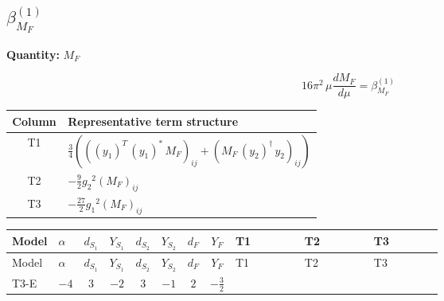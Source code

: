 \documentclass[8pt]{article}
\begin{document}
\begin{landscape}
\section*{$\beta_{M_F}^{(1)}$}
\noindent\textbf{Quantity: }$M_F$\par\smallskip
\[16\pi^2\,\mu\frac{d M_F}{d\mu}=\beta_{M_F}^{(1)}\]
\begin{center}
\begin{tabular}{@{}c >{\raggedright\arraybackslash}p{0.82\linewidth}@{}}
\toprule
Column & Representative term structure \\
\midrule
T1 & \(\displaystyle \frac{3}{4} (\left(\left({y_1}\right)^{T}\,\left({y_1}\right)^{*}\,{M_F}\right)_{ij}+\left({M_F}\,\left({y_2}\right)^{\dagger}\,{y_2}\right)_{ij})\) \\
\midrule
T2 & \(\displaystyle -\frac{9}{2} {g_2}^2 \left({M_F}\right)_{ij}\) \\
\midrule
T3 & \(\displaystyle -\frac{27}{2} {g_1}^2 \left({M_F}\right)_{ij}\) \\
\midrule
\bottomrule
\end{tabular}
\end{center}
\smallskip
\tiny
\begin{longtable}{@{}llcccccc >{\raggedright\arraybackslash}p{0.21\linewidth} >{\raggedright\arraybackslash}p{0.21\linewidth} >{\raggedright\arraybackslash}p{0.21\linewidth}@{}}
\toprule
Model & $\alpha$ & $d_{S_1}$ & $Y_{S_1}$ & $d_{S_2}$ & $Y_{S_2}$ & $d_F$ & $Y_F$ & T1 & T2 & T3 \\
\midrule
\endfirsthead
\toprule
Model & $\alpha$ & $d_{S_1}$ & $Y_{S_1}$ & $d_{S_2}$ & $Y_{S_2}$ & $d_F$ & $Y_F$ & T1 & T2 & T3 \\
\midrule
\endhead
T3-E & $-4$ & $3$ & $-2$ & $3$ & $-1$ & $2$ & $-\frac{3}{2}$ & \scriptsize\adjustbox{max width=\linewidth}{$\begin{gathered} \frac{3}{4} (\left(\left({y_1}\right)^{T}\,\left({y_1}\right)^{*}\,{M_F}\right)_{ij}+\left({M_F}\,\left({y_2}\right)^{\dagger}\,{y_2}\right)_{ij})\end{gathered}$} & \scriptsize\adjustbox{max width=\linewidth}{$\begin{gathered} -\frac{9}{2} {g_2}^2 \left({M_F}\right)_{ij}\end{gathered}$} & \scriptsize\adjustbox{max width=\linewidth}{$\begin{gathered} -\frac{27}{2} {g_1}^2 \left({M_F}\right)_{ij}\end{gathered}$} \\
\midrule
\bottomrule
\end{longtable}
\clearpage

\end{landscape}
\end{document}
